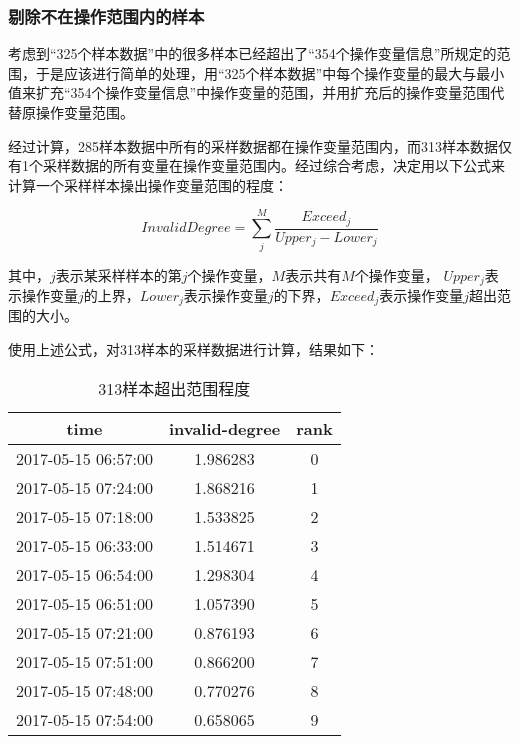 \documentclass[bwprint]{gmcmthesis}
\begin{document}
\FloatBarrier
\subsubsection{剔除不在操作范围内的样本}

考虑到“325个样本数据”中的很多样本已经超出了“354个操作变量信息”所规定的范围，于是应该进行简单的处理，用“325个样本数据”中每个操作变量的最大与最小值来扩充“354个操作变量信息”中操作变量的范围，并用扩充后的操作变量范围代替原操作变量范围。

经过计算，285样本数据中所有的采样数据都在操作变量范围内，而313样本数据仅有1个采样数据的所有变量在操作变量范围内。经过综合考虑，决定用以下公式来计算一个采样样本操出操作变量范围的程度：

\begin{equation}
	InvalidDegree=\sum^M_j{\frac{Exceed_j}{Upper_j - Lower_j}}
	\label{eq:range-invalid-degree}
\end{equation}

其中，$j$表示某采样样本的第$j$个操作变量，$M$表示共有$M$个操作变量， $Upper_j$表示操作变量$j$的上界，$Lower_j$表示操作变量$j$的下界，$Exceed_j$表示操作变量$j$超出范围的大小。

使用上述公式，对313样本的采样数据进行计算，结果如下：

\begin{table}[htb]
	\caption{313样本超出范围程度}\label{tab:001} \centering
	\begin{tabular}{ccc}
	\toprule[1.5pt]
	time &  invalid-degree &  rank \\
	\midrule[1pt]
	2017-05-15 06:57:00 &        1.986283 &     0 \\
	2017-05-15 07:24:00 &        1.868216 &     1 \\
	2017-05-15 07:18:00 &        1.533825 &     2 \\
	2017-05-15 06:33:00 &        1.514671 &     3 \\
	2017-05-15 06:54:00 &        1.298304 &     4 \\
	2017-05-15 06:51:00 &        1.057390 &     5 \\
	2017-05-15 07:21:00 &        0.876193 &     6 \\
	2017-05-15 07:51:00 &        0.866200 &     7 \\
	2017-05-15 07:48:00 &        0.770276 &     8 \\
	2017-05-15 07:54:00 &        0.658065 &     9 \\
	\bottomrule[1.5pt]
\end{tabular}
\end{table}
\end{document}
